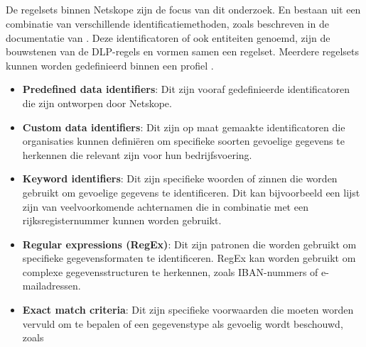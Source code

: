 \subsection{}
\label{subsec:regelsets-literatuurstudie}

De regelsets binnen Netskope zijn de focus van dit onderzoek. En bestaan uit een combinatie van verschillende identificatiemethoden, zoals beschreven in de documentatie van \textcite{Netskope2025DLP}. 
Deze identificatoren of ook entiteiten genoemd, zijn de bouwstenen van de DLP-regels en vormen samen een regelset. 
Meerdere regelsets kunnen worden gedefinieerd binnen een profiel \autocite{Netskope2025Profiles}.



{\small
\begin{itemize}
    \item \textbf{Predefined data identifiers}: Dit zijn vooraf gedefinieerde identificatoren die zijn ontworpen door Netskope.
    \item \textbf{Custom data identifiers}: Dit zijn op maat gemaakte identificatoren die organisaties kunnen definiëren om specifieke soorten gevoelige gegevens te herkennen die relevant zijn voor hun bedrijfsvoering.
    \item \textbf{Keyword identifiers}: Dit zijn specifieke woorden of zinnen die worden gebruikt om gevoelige gegevens te identificeren. Dit kan bijvoorbeeld een lijst zijn van veelvoorkomende achternamen die in combinatie met een rijksregisternummer kunnen worden gebruikt.
    \item \textbf{Regular expressions (RegEx)}: Dit zijn patronen die worden gebruikt om specifieke gegevensformaten te identificeren. RegEx kan worden gebruikt om complexe gegevensstructuren te herkennen, zoals IBAN-nummers of e-mailadressen.
    \item \textbf{Exact match criteria}: Dit zijn specifieke voorwaarden die moeten worden vervuld om te bepalen of een gegevenstype als gevoelig wordt beschouwd, zoals 
\end{itemize}
}


